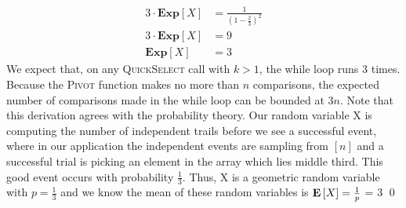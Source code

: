 \documentclass[12pt]{article}
\begin{document}
\begin{solution}
\begin{subprob}
        \begin{align*}
            3 \cdot \textbf{Exp}[X] &= \frac{1}{(1 - \frac{2}{3})^2} \\
            3 \cdot \textbf{Exp}[X] &= 9 \\
            \textbf{Exp}[X] &= 3
        \end{align*}
        We expect that, on any \textsc{QuickSelect} call with $k > 1$, the while loop runs $3$ times. Because the \textsc{Pivot} function makes no more than $n$ comparisons, the expected number of comparisons made in the while loop can be bounded at $3n$. Note that this derivation agrees with the probability theory. Our random variable X is computing the number of independent trails before we see a successful event, where in our application the independent events are sampling from $[n]$ and a successful trial is picking an element in the array which lies middle third. This good event occurs with probability $\frac{1}{3}$. Thus, X is a geometric random variable with $p=\frac{1}{3}$ and we know the mean of these random variables is $\mathbf{E}\left[X\right]=\frac{1}{p}$ = 3 \qed


\end{subprob}
\end{solution}
\end{document}
